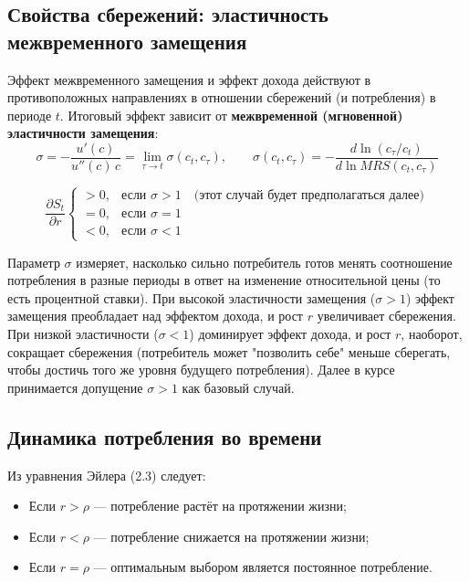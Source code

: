 \documentclass[10pt,a4paper]{article}
\begin{document}
\subsection{Свойства сбережений: эластичность межвременного замещения}
 
Эффект межвременного замещения и эффект дохода действуют в противоположных направлениях в отношении сбережений (и потребления) в периоде $t$. Итоговый эффект зависит от \textbf{межвременной (мгновенной) эластичности замещения}:
\[
\sigma = -\frac{u'(c)}{u''(c)\,c} = \lim_{\tau\to t}\sigma(c_t, c_\tau), \qquad
\sigma(c_t,c_\tau) = -\frac{d\ln(c_\tau/c_t)}{d\ln MRS(c_t,c_\tau)}
\]
 
\[
\frac{\partial S_t}{\partial r}
\begin{cases}
>0, & \text{если } \sigma > 1 \quad \text{(этот случай будет предполагаться далее)}\\
=0, & \text{если } \sigma = 1\\
<0, & \text{если } \sigma < 1
\end{cases}
\]
 
\begin{intuition}
Параметр $\sigma$ измеряет, насколько сильно потребитель готов менять соотношение потребления в разные периоды в ответ на изменение относительной цены (то есть процентной ставки). При высокой эластичности замещения ($\sigma>1$) эффект замещения преобладает над эффектом дохода, и рост $r$ увеличивает сбережения. При низкой эластичности ($\sigma<1$) доминирует эффект дохода, и рост $r$, наоборот, сокращает сбережения (потребитель может "позволить себе" меньше сберегать, чтобы достичь того же уровня будущего потребления). Далее в курсе принимается допущение $\sigma>1$ как базовый случай.
\end{intuition}
 
\subsection{Динамика потребления во времени}
 
Из уравнения Эйлера (2.3) следует:
\begin{itemize}
\item Если $r > \rho$ — потребление растёт на протяжении жизни;
\item Если $r < \rho$ — потребление снижается на протяжении жизни;
\item Если $r = \rho$ — оптимальным выбором является постоянное потребление.
\end{itemize}
 
\end{document}
